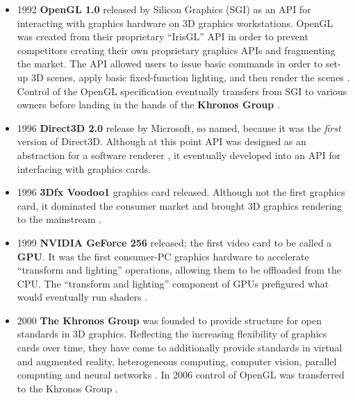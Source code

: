 \documentclass[a4paper,12pt,twoside,openright]{report}
\begin{document}

\begin{itemize}

    \item 1992 \textbf{OpenGL 1.0} released by Silicon Graphics (SGI) as an API
    for interacting with graphics hardware on 3D graphics workstations. OpenGL
    was created from their proprietary ``IrisGL'' API in order to prevent
    competitors creating their own proprietary graphics APIs and fragmenting
    the market. The API allowed users to issue basic commands in order to
    set-up 3D scenes, apply basic fixed-function lighting, and then render the
    scenes \cite{OpenGL_1_0}. Control of the OpenGL specification eventually
    transfers from SGI to various owners before landing in the hands of the
    \textbf{Khronos Group} \cite{OpenGL}.

    \item 1996 \textbf{Direct3D 2.0} release by Microsoft, so named, because it
    was the \textit{first} version of Direct3D. Although at this point API was
    designed as an abstraction for a software renderer
    \cite{JohnCarmackPlanDirect3DvsOpenGl}, it eventually developed into an API
    for interfacing with graphics cards.

    \item 1996 \textbf{3Dfx Voodoo1} graphics card released. Although not the
    first graphics card, it dominated the consumer market and brought 3D
    graphics rendering to the mainstream \cite{Voodoo1}.

    \item 1999 \textbf{NVIDIA GeForce 256} released; the first video card to be
    called a \textbf{GPU}. It was the first consumer-PC graphics hardware to
    accelerate ``transform and lighting'' operations, allowing them to be
    offloaded from the CPU. The ``transform and lighting'' component of GPUs
    prefigured what would eventually run shaders \cite{GeForce256}.

    \item 2000 \textbf{The Khronos Group} was founded to provide structure for
    open standards in 3D graphics. Reflecting the increasing flexibility of
    graphics cards over time, they have come to additionally provide standards
    in virtual and augmented reality, heterogeneous computing, computer vision,
    parallel computing and neural networks \cite{KhronosGroupAbout}. In 2006
    control of OpenGL was transferred to the Khronos Group
    \cite{OpenGLToKhronos}.


\end{itemize}
\end{document}

